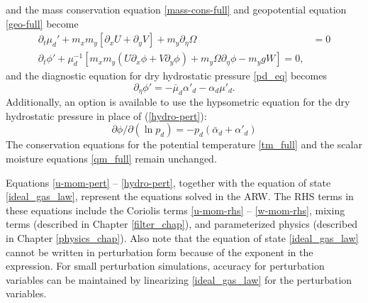 %
and the mass conservation equation \eqref{mass-cons-full}
and geopotential equation \eqref{geo-full} become
%
\begin{align}
\partial_t  \mu_d' + m_x m_y[\partial_x U + \partial_y V] + m_y
\partial_\eta \Omega
& = 0 \\
%
\partial_t \phi' 
+ \mu_d^{-1}
[m_x m_y (U\partial_x\phi + V\partial_y\phi) + m_y
\Omega\partial_\eta\phi -m_y gW ] = 0,
\label{phi_pert}
%
\end{align}
%
\noindent
and the diagnostic equation for dry hydrostatic pressure \eqref{pd_eq} becomes
%
\begin{equation}
\partial_\eta \phi' =-\bar\mu_d \alpha'_d-\alpha_d\mu'_d.
\label{hydro-pert}
\end{equation}
%
Additionally, an option is available to use the hypsometric equation for the dry hydrostatic pressure in place of (\ref{hydro-pert}):
\begin{equation}
{\partial \phi / \partial (\ln p_d)} = - p_d(\bar \alpha_d + \alpha'_d)
\label{hypsometric_eqn}
\end{equation}
%
The conservation equations for the potential temperature \eqref{tm_full} and 
the scalar moisture equations \eqref{qm_full} remain unchanged.

Equations \eqref{u-mom-pert} -- \eqref{hydro-pert},
together with the equation of state \eqref{ideal_gas_law},
represent the equations solved in the ARW.
The RHS terms in these equations include the
Coriolis terms \eqref{u-mom-rhs} -- \eqref{w-mom-rhs},
mixing terms (described in Chapter \ref{filter_chap}), and
parameterized physics (described in Chapter \ref{physics_chap}).  
Also note that the equation of state \eqref{ideal_gas_law} cannot be
written in perturbation form because of the exponent in the expression.
For small perturbation simulations, accuracy for perturbation variables
can be maintained by linearizing \eqref{ideal_gas_law} for the
perturbation variables.
%


